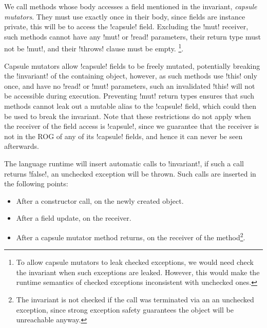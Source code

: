 We call \Q@mut@ methods whose body accesses a \Q@capsule@ field mentioned in the invariant, \emph{capsule mutators}.  
They must use \Q@this@ exactly once in their body, since fields are instance private, this will be to access the \Q!capsule! field.
Excluding the \Q!mut! receiver, such methods cannot have any \Q!mut! or \Q!read! parameters, their return type must not be \Q!mut!, and their \Q!throws! clause must be empty.%
\footnote{%
To allow capsule mutators to leak checked exceptions,
we would need check the invariant
when such exceptions are leaked. However, this would make the runtime semantics of checked exceptions inconsistent with unchecked ones.}.

Capsule mutators allow \Q!capsule! fields to be freely mutated, potentially breaking the \Q!invariant! of the containing object, however, as such methods use \Q!this!
only once, and have no \Q!read! or \Q!mut! parameters, such an invalidated \Q!this! will not be accessible during execution.
Preventing \Q!mut! return types ensures that such methods cannot leak out a mutable alias to the \Q!capsule! field, which could then be used to break the invariant.
Note that these restrictions do not apply when the receiver of the field access is \Q!capsule!, since we guarantee that the receiver is not in the ROG of any of its \Q!capsule! fields, and hence it can never be seen afterwards.

The language runtime will insert automatic calls to \Q!invariant!, if such a call returns \Q!false!, an unchecked exception will be thrown. Such calls are inserted in the following points:
\begin{itemize}
	\item After a constructor call, on the newly created object.
	\item After a field update, on the receiver.
	\item After a capsule mutator method returns, on the receiver of the method\footnote{The invariant is not checked if the call was terminated via an an unchecked exception, since strong exception safety guarantees the object will be unreachable anyway.}.
\end{itemize}

